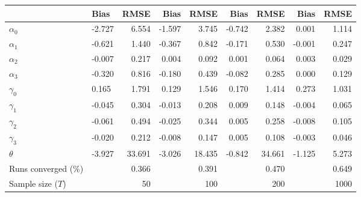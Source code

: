 
\begin{tabular}[t]{llrrrrrrr}
\toprule
  & Bias & RMSE & Bias & RMSE & Bias & RMSE & Bias & RMSE\\
\midrule
$\alpha_{0}$ & -2.727 & 6.554 & -1.597 & 3.745 & -0.742 & 2.382 & 0.001 & 1.114\\
$\alpha_{1}$ & -0.621 & 1.440 & -0.367 & 0.842 & -0.171 & 0.530 & -0.001 & 0.247\\
$\alpha_{2}$ & -0.007 & 0.217 & 0.004 & 0.092 & 0.001 & 0.064 & 0.003 & 0.029\\
$\alpha_{3}$ & -0.320 & 0.816 & -0.180 & 0.439 & -0.082 & 0.285 & 0.000 & 0.129\\
$\gamma_{0}$ & 0.165 & 1.791 & 0.129 & 1.546 & 0.170 & 1.414 & 0.273 & 1.031\\
$\gamma_{1}$ & -0.045 & 0.304 & -0.013 & 0.208 & 0.009 & 0.148 & -0.004 & 0.065\\
$\gamma_{2}$ & -0.061 & 0.494 & -0.025 & 0.344 & 0.005 & 0.258 & -0.008 & 0.105\\
$\gamma_{3}$ & -0.020 & 0.212 & -0.008 & 0.147 & 0.005 & 0.108 & -0.003 & 0.046\\
$\theta$ & -3.927 & 33.691 & -3.026 & 18.435 & -0.842 & 34.661 & -1.125 & 5.273\\
Runs converged (\%) &  & 0.366 &  & 0.391 &  & 0.470 &  & 0.649\\
Sample size ($T$) &  & 50 &  & 100 &  & 200 &  & 1000\\
\bottomrule
\end{tabular}
